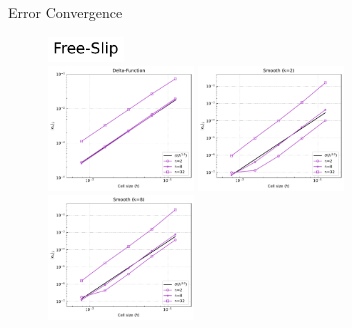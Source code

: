 \documentclass[10pt,aspectratio=169]{beamer}
\begin{document}
\begin{frame}[fragile]{Error Convergence}
	\begin{figure}
	
		\includegraphics[width=2cm]{../Annulus_Benchmark_Kramer/benchmark_figs/label_Free-Slip.pdf}
		\vspace{-0.15in}
		\begin{multicols}{3}
			\includegraphics[width=3.85cm]{../Annulus_Benchmark_Kramer/benchmark_figs/case1_k_0_vel_err_conv_vel_penalty_2.5e+08_stokes_tol_1.0e-10.pdf}\par
			\hspace{-0.08in}
			\includegraphics[width=3.85cm]{../Annulus_Benchmark_Kramer/benchmark_figs/case2_k_2_vel_err_conv_vel_penalty_2.5e+08_stokes_tol_1.0e-10.pdf}\par
			\hspace{-0.12in}
			\includegraphics[width=3.85cm]{../Annulus_Benchmark_Kramer/benchmark_figs/case2_k_8_vel_err_conv_vel_penalty_2.5e+08_stokes_tol_1.0e-10.pdf}
		\end{multicols}
		
		\vspace{-0.3in}
		

\end{figure}
\end{frame}
\end{document}
